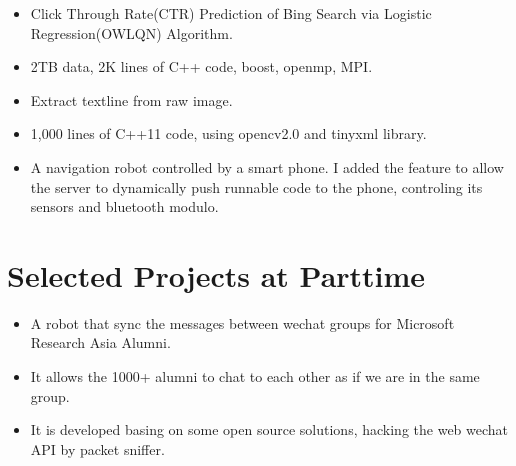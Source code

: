 \documentclass{resume}
\begin{document}
 \begin{itemize}
    \item Click Through Rate(CTR) Prediction of Bing Search via Logistic Regression(OWLQN) Algorithm.
    \item 2TB data, 2K lines of C++ code, boost, openmp, MPI.
 \end{itemize}

 \begin{itemize}
    \item Extract textline from raw image.
    \item 1,000 lines of C++11 code, using opencv2.0 and tinyxml library.
 \end{itemize}

 \begin{itemize}
    \item A navigation robot controlled by a smart phone.
    I added the feature to allow the server to dynamically push runnable code to the phone,
        controling its sensors and bluetooth modulo.
 \end{itemize}

\section{Selected Projects at Parttime}
 \begin{itemize}
    \item A robot that sync the messages between wechat groups for Microsoft Research Asia Alumni.
    \item It allows the 1000+ alumni to chat to each other as if we are in the same group.
    \item It is developed basing on some open source solutions, hacking the web wechat API by packet sniffer.
 \end{itemize}

 

%
%
\end{document}
